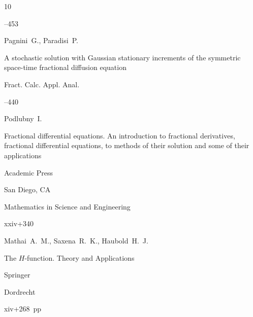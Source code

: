 \begin{thebibliography}{10}


--453







\by Pagnini~G., Paradisi~P.

\paper A stochastic solution with Gaussian stationary increments of the symmetric space-time fractional diffusion equation

\jour Fract. Calc. Appl. Anal.




--440







\by Podlubny~I.

\book Fractional differential equations. An introduction to fractional derivatives, fractional differential equations, to methods of their solution and some of their applications


\publ Academic Press

\publaddr  San Diego, CA


\serial Mathematics in Science and Engineering


\totalpages xxiv+340






\by Mathai~A.~M., Saxena~R.~K., Haubold~H.~J.

\book The $H$-function. Theory and Applications


\publ Springer

\publaddr  Dordrecht

\totalpages xiv+268~pp \nofrills












\end{thebibliography}
